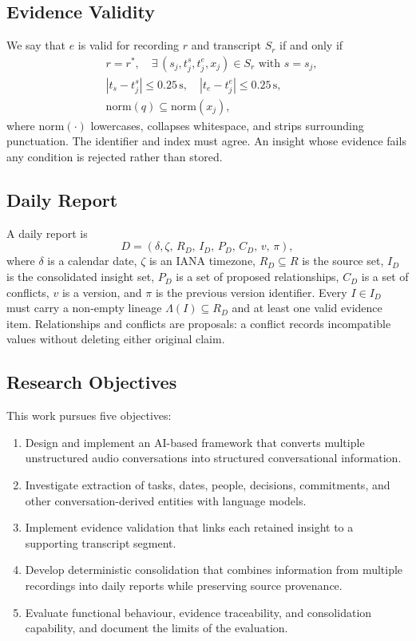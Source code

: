 \documentclass[conference,a4paper]{IEEEtran}
\begin{document}
\subsection{Evidence Validity}

We say that $e$ is valid for recording $r$ and transcript $S_r$ if and only if
\begin{align}
& r = r^{*},\quad \exists\,(s_j,t^{s}_j,t^{e}_j,x_j)\in S_r \text{ with } s=s_j,\\
& |t_s-t^{s}_j|\le 0.25\,\text{s},\quad |t_e-t^{e}_j|\le 0.25\,\text{s},\\
& \mathrm{norm}(q)\subseteq \mathrm{norm}(x_j),
\end{align}
where $\mathrm{norm}(\cdot)$ lowercases, collapses whitespace, and strips surrounding
punctuation. The identifier and index must agree. An insight whose evidence fails any
condition is rejected rather than stored.

\subsection{Daily Report}

A daily report is
\begin{equation}
D=(\delta,\zeta,\,R_D,\,I_D,\,P_D,\,C_D,\,v,\,\pi),
\end{equation}
where $\delta$ is a calendar date, $\zeta$ is an IANA timezone, $R_D\subseteq R$ is the
source set, $I_D$ is the consolidated insight set, $P_D$ is a set of proposed
relationships, $C_D$ is a set of conflicts, $v$ is a version, and $\pi$ is the previous
version identifier. Every $I\in I_D$ must carry a non-empty lineage
$\Lambda(I)\subseteq R_D$ and at least one valid evidence item. Relationships and
conflicts are proposals: a conflict records incompatible values without deleting either
original claim.

\subsection{Research Objectives}

This work pursues five objectives:
\begin{enumerate}
\item Design and implement an AI-based framework that converts multiple unstructured
audio conversations into structured conversational information.
\item Investigate extraction of tasks, dates, people, decisions, commitments, and other
conversation-derived entities with language models.
\item Implement evidence validation that links each retained insight to a supporting
transcript segment.
\item Develop deterministic consolidation that combines information from multiple
recordings into daily reports while preserving source provenance.
\item Evaluate functional behaviour, evidence traceability, and consolidation capability,
and document the limits of the evaluation.
\end{enumerate}
\end{document}
